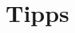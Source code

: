 \documentclass[english,hyperref={pdfpagelabels=false},aspectratio=169]{beamer}
\begin{document}
% 
% 


\part{Tipps}
\makepart
\end{document}
